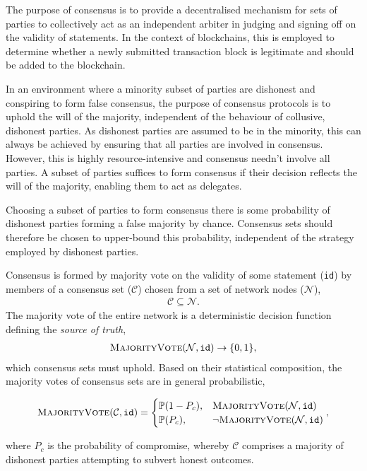 The purpose of consensus is to provide a decentralised mechanism for sets of parties to collectively act as an independent arbiter in judging and signing off on the validity of statements. In the context of blockchains, this is employed to determine whether a newly submitted transaction block is legitimate and should be added to the blockchain.

In an environment where a minority subset of parties are dishonest and conspiring to form false consensus, the purpose of consensus protocols is to uphold the will of the majority, independent of the behaviour of collusive, dishonest parties. As dishonest parties are assumed to be in the minority, this can always be achieved by ensuring that all parties are involved in consensus. However, this is highly resource-intensive and consensus needn't involve all parties. A subset of parties suffices to form consensus if their decision reflects the will of the majority, enabling them to act as delegates.

Choosing a subset of parties to form consensus there is some probability of dishonest parties forming a false majority by chance. Consensus sets should therefore be chosen to upper-bound this probability, independent of the strategy employed by dishonest parties.

Consensus is formed by majority vote on the validity of some statement (\texttt{id}) by members of a consensus set ($\mathcal{C}$) chosen from a set of network nodes ($\mathcal{N}$),
\begin{align}
	\mathcal{C}\subseteq\mathcal{N}.
\end{align}
The majority vote of the entire network is a deterministic decision function defining the \emph{source of truth},
\begin{align} \label{eq:majority_vote_det}
	\textsc{MajorityVote}(\mathcal{N},\mathtt{id})\to\{0,1\},
\end{align}
which consensus sets must uphold. Based on their statistical composition, the majority votes of consensus sets are in general probabilistic,
\begin{widetext}
	\begin{align*}
		\textsc{MajorityVote}(\mathcal{C},\mathtt{id}) = \begin{cases}
				\mathbb{P}(1-P_c), & \textsc{MajorityVote}(\mathcal{N}, \mathtt{id}) \\
				\mathbb{P}(P_c), & \neg \textsc{MajorityVote}(\mathcal{N}, \mathtt{id})
			\end{cases},
	\end{align*}
\end{widetext}
where $P_c$ is the probability of compromise, whereby $\mathcal{C}$ comprises a majority of dishonest parties attempting to subvert honest outcomes.

